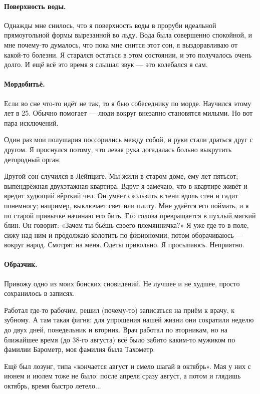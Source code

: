 \documentclass{book}
\begin{document}
\paragraph{Поверхность воды.}
Однажды мне снилось, что я поверхность воды в проруби идеальной прямоугольной формы вырезанной во льду.
Вода была совершенно спокойной, и мне почему-то думалось, что пока мне снится этот сон, я выздоравливаю от какой-то болезни.
Я старался остаться в этом состоянии, и это получалось очень долго.
И ещё всё это время я слышал звук --- это колебался я сам.

\paragraph{Мордобитьё.}
Если во сне что-то идёт не так, то я бью собеседнику по морде.
Научился этому лет в 25.
Обычно помогает --- люди вокруг внезапно становятся милыми.
Но вот пара исключений. 

Один раз мои полушария поссорились между собой, и руки стали драться друг с другом.
Я проснулся потому, что левая рука догадалась больно выкрутить детородный орган.

Другой сон случился в Лейпциге.
Мы жили в старом доме, ему лет пятьсот;
выпендрёжная двухэтажная квартира.
Вдруг я замечаю, что в квартире живёт и вредит худющий вёрткий чел.
Он умеет скользить в тени вдоль стен и гадит понемногу; например, выключает свет или плиту.
Мне удаётся его поймать, и я по старой привычке начинаю его бить.
Его голова превращается в пухлый мягкий блин.
Он говорит: «Зачем ты бьёшь своего племянничка?»
Я уже где-то в поле, сижу над ним и продолжаю колотить по физиономии, потом оборачиваюсь --- вокруг народ. 
Смотрят на меня.
Одеты прикольно. 
Я просыпаюсь.
Неприятно.

\paragraph{Образчик.}
Привожу одно из моих бонских сновидений.
Не лучшее и не худшее, просто сохранилось в записях.

Работал где-то рабочим, решил (почему-то) записаться на приём к врачу, к зубному.
А там такая фигня: для упрощения нашей жизни они сократили неделю до двух дней, понедельник и вторник. 
Врач работал по вторникам, но на ближайшее время (до 38-го августа) всё было забито каким-то мужиком по фамилии Барометр, моя фамилия была Тахометр.

Ещё был лозунг, типа «кончается август и смело шагай в октябрь».
Мая у них с июнем и июлем тоже не было: после апреля сразу август, а потом и глядишь октябрь, время быстро летело...
\end{document}
